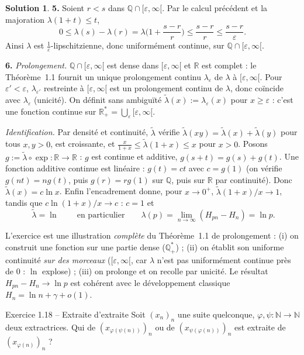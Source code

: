 \documentclass[11pt,a4paper]{article}
\newcommand{\R}{\mathbb{R}}
\newcommand{\N}{\mathbb{N}}
\newcommand{\Q}{\mathbb{Q}}
\theoremstyle{definition}
\newtheorem*{solution}{Solution}
\begin{document}
\begin{solution}
\medskip
\noindent\textbf{5.} Soient $r<s$ dans $\Q\cap[\varepsilon,\infty[$. Par le calcul précédent et la majoration $\lambda(1+t)\le t$,
\[
0\le\lambda(s)-\lambda(r)=\lambda\Big(1+\frac{s-r}r\Big)\le\frac{s-r}{r}\le\frac{s-r}{\varepsilon}.
\]
Ainsi $\lambda$ est $\frac1\varepsilon$-lipschitzienne, donc uniformément continue, sur $\Q\cap[\varepsilon,\infty[$.

\medskip
\noindent\textbf{6.} \emph{Prolongement.} $\Q\cap[\varepsilon,\infty[$ est dense dans $[\varepsilon,\infty[$ et $\R$ est complet : le Théorème~1.1 fournit un unique prolongement continu $\lambda_\varepsilon$ de $\lambda$ à $[\varepsilon,\infty[$. Pour $\varepsilon'<\varepsilon$, $\lambda_{\varepsilon'}$ restreinte à $[\varepsilon,\infty[$ est un prolongement continu de $\lambda$, donc coïncide avec $\lambda_\varepsilon$ (unicité). On définit sans ambiguïté $\tilde\lambda(x):=\lambda_\varepsilon(x)$ pour $x\ge\varepsilon$ : c'est une fonction continue sur $\R_+^*=\bigcup_\varepsilon[\varepsilon,\infty[$.

\emph{Identification.} Par densité et continuité, $\tilde\lambda$ vérifie $\tilde\lambda(xy)=\tilde\lambda(x)+\tilde\lambda(y)$ pour tous $x,y>0$, est croissante, et $\frac x{1+x}\le\tilde\lambda(1+x)\le x$ pour $x>0$. Posons $g:=\tilde\lambda\circ\exp:\R\to\R$ : $g$ est continue et additive, $g(s+t)=g(s)+g(t)$. Une fonction additive continue est linéaire : $g(t)=ct$ avec $c=g(1)$ (on vérifie $g(n t)=ng(t)$, puis $g(r)=rg(1)$ sur $\Q$, puis sur $\R$ par continuité). Donc $\tilde\lambda(x)=c\ln x$. Enfin l'encadrement donne, pour $x\to0^+$, $\tilde\lambda(1+x)/x\to1$, tandis que $c\ln(1+x)/x\to c$ : $c=1$ et
\[
\boxed{\ \tilde\lambda=\ln\ }\qquad\text{en particulier}\qquad\lambda(p)=\lim_{n\to\infty}(H_{pn}-H_n)=\ln p .
\]
\end{solution}

\begin{pointcle}
L'exercice est une illustration \emph{complète} du Théorème~1.1 de prolongement : (i) on construit une fonction sur une partie dense ($\Q_+^*$) ; (ii) on établit son uniforme continuité \emph{sur des morceaux} ($[\varepsilon,\infty[$, car $\lambda$ n'est pas uniformément continue près de $0$ : $\ln$ explose) ; (iii) on prolonge et on recolle par unicité. Le résultat $H_{pn}-H_n\to\ln p$ est cohérent avec le développement classique $H_n=\ln n+\gamma+o(1)$.
\end{pointcle}

\begin{exo}{Exercice 1.18 -- Extraite d'extraite}
Soit $(x_n)_n$ une suite quelconque, $\varphi,\psi:\N\to\N$ deux extractrices. Qui de $(x_{\varphi(\psi(n))})_n$ ou de $(x_{\psi(\varphi(n))})_n$ est extraite de $(x_{\varphi(n)})_n$ ?
\end{exo}
\end{document}
